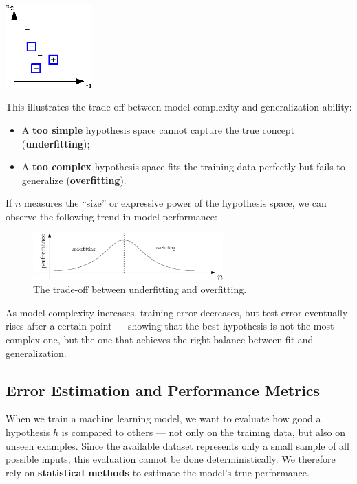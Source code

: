 \documentclass[10pt, letterpaper]{report}
\begin{document}
\begin{center}
	\includegraphics[width=0.25\textwidth]{images/N2_hypothesis_3.eps}
\end{center}

This illustrates the trade-off between model complexity and generalization ability:
\begin{itemize}
	\item A \textbf{too simple} hypothesis space cannot capture the true concept (\textbf{underfitting});
	\item A \textbf{too complex} hypothesis space fits the training data perfectly but fails to generalize (\textbf{overfitting}).
\end{itemize}

\bigskip
If $n$ measures the “size” or expressive power of the hypothesis space, we can observe the following trend in model performance:

\begin{figure}[h!]
	\centering
	\includegraphics[width=0.65\textwidth]{images/fitting.eps}
	\caption{The trade-off between underfitting and overfitting.}
	\label{img:fitting_trend}
\end{figure}

As model complexity increases, training error decreases, but test error eventually rises after a certain point — showing that the best hypothesis is not the most complex one, but the one that achieves the right balance between fit and generalization.

\bigskip
\subsection{Error Estimation and Performance Metrics}

When we train a machine learning model, we want to evaluate how good a hypothesis $h$ is compared to others — not only on the training data, but also on unseen examples.
Since the available dataset represents only a small sample of all possible inputs, this evaluation cannot be done deterministically.
We therefore rely on \textbf{statistical methods} to estimate the model’s true performance.
\end{document}
